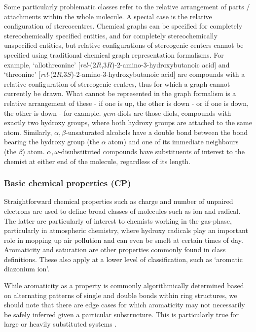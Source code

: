 \documentclass[10pt]{bmc_article}
\newenvironment{bmcformat}{\baselineskip20pt\sloppy\setboolean{publ}{false}}{\baselineskip20pt\sloppy}
\begin{document}
\begin{bmcformat}
Some particularly problematic classes refer to the relative arrangement of parts / attachments within the whole molecule. A special case is the relative configuration of stereocentres. Chemical graphs can be specified for completely stereochemically specified entities, and for completely stereochemically unspecified entities, but relative configurations of stereogenic centers cannot be specified using traditional chemical graph representation formalisms. For example, `allothreonine' [\textit{rel}-(2$R$,3$R$)-2-amino-3-hydroxybutanoic acid] and `threonine' [\textit{rel}-(2$R$,3$S$)-2-amino-3-hydroxybutanoic acid] are compounds with a relative configuration of stereogenic centres, thus for which a graph cannot currently be drawn. What cannot be represented in the graph formalism is a relative arrangement of these - if one is up, the other is down - or if one is down, the other is down - for example. 
\textit{gem}-diols are those diols, compounds with exactly two hydroxy groups, where both hydroxy groups are attached to the same atom.  Similarly, $\alpha,\beta$-unsaturated alcohols have a double bond between the bond bearing the hydroxy group (the $\alpha$ atom) and one of its immediate neighbours (the $\beta$) atom. $\alpha,\omega$-disubstituted compounds have substituents of interest to the chemist at either end of the molecule, regardless of its length.


\subsubsection*{Basic chemical properties (CP)}

Straightforward chemical properties such as charge and number of unpaired electrons are used to define broad classes of molecules such as ion and radical. The latter are particularly of interest to chemists working in the gas-phase, particularly in atmospheric chemistry, where hydroxy radicals play an important role in mopping up air pollution and can even be smelt at certain times of day. Aromaticity and saturation are other properties commonly found in class definitions. These also apply at a lower level of classification, such as `aromatic diazonium ion'.  

While aromaticity as a property is commonly algorithmically determined based on alternating patterns of single and double bonds within ring structures, we should note that there are edge cases for which aromaticity may not necessarily be safely inferred given a particular substructure. This is particularly true for large or heavily substituted systems \cite{rzepa2006}. 



\end{bmcformat}
\end{document}
